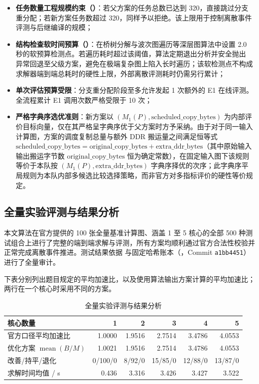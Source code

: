 \documentclass[anonymous,notoc]{gmcm2026}
\providecommand{\tightlist}{\setlength{\itemsep}{0pt}\setlength{\parskip}{0pt}}
\begin{document}
\begin{itemize}
\tightlist
\item
  \textbf{任务数量工程规模约束（\texttt{}）}：若父方案的任务总数已达到 320，直接跳过分支重分配；若新方案任务数超过 320，同样予以拒绝。该上限用于控制离散事件评测与后继编译的规模；
\item
  \textbf{结构检查软时间预算（\texttt{}）}：在桥树分解与波次图遍历等深层图算法中设置 2.0 秒的软预算检测点。若遍历耗时超过该阈值，算法定期退出分析并安全抛出 \texttt{} 异常回退至父级方案，避免在极端复杂图上陷入长时遍历；该软检测点不构成求解器端到端总耗时的硬性上限，外部离散评测耗时仍需另行累计；
\item
  \textbf{单次评估预算受限}：分支重分配阶段至多允许发起 1 次额外的 E1 在线评测。全流程累计 E1 调用次数严格受限于 10 次；
\item
  \textbf{严格字典序选优准则}：新方案以 \((M_1(P), \text{scheduled\_copy\_bytes})\) 为内部评价目标向量，仅在其严格呈字典序优于父方案时方予采纳。由于对于同一输入计算图，方案的调度复制总量与额外 DDR 搬运量之间满足恒等式 \(\text{scheduled\_copy\_bytes} = \text{original\_copy\_bytes} + \text{extra\_ddr\_bytes}\)（其中原始输入输出搬运字节数 \(\text{original\_copy\_bytes}\) 恒为确定常数），在固定输入图下该规则等价于本队按 \((M_1(P), \text{extra\_ddr\_bytes})\) 字典序择优的次序；此字典序平局规则为本队内部多候选比较选择策略，而非官方对多指标评价的硬性等价规定。
\end{itemize}

\subsection{全量实验评测与结果分析}

本文算法在官方提供的 100 张全量基准计算图、涵盖 1 至 5 核心的全部 500 种测试组合上进行了完整的端到端求解与评测，所有方案均顺利通过官方合法性校验并正常完成离散事件推进。测试结果依据 \texttt{} 与固定哈希账本（\texttt{}，Commit \texttt{a1bb4451}）进行了全量审计。

下表分别列出题目规定的平均加速比，以及使用算法输出方案计算的平均加速比；两行在一个核心时采用不同的方案。

\begin{table}[!htbp]\centering
\caption{全量实验评测与结果分析}\label{tab:04-p1-1}\small

\begin{tabularx}{\linewidth}{@{}Xrrrrr@{}}\toprule
核心数量 & 1 & 2 & 3 & 4 & 5 \\
\midrule
官方口径平均加速比 & 1.0000 & 1.9516 & 2.7514 & 3.4786 & 4.0553 \\
优化方案 $\operatorname{mean}(B/M)$ & 1.0021 & 1.9516 & 2.7514 & 3.4786 & 4.0553 \\
改善/持平/退化 & 0/100/0 & 8/92/0 & 15/85/0 & 12/88/0 & 13/87/0 \\
求解时间均值 / s & 0.436 & 3.316 & 3.426 & 3.427 & 3.522 \\
\bottomrule\end{tabularx}\end{table}
\end{document}
